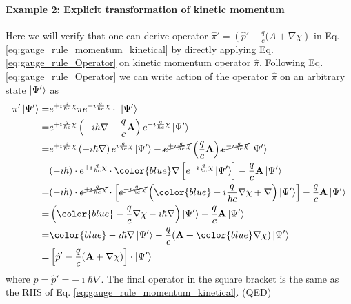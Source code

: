 \documentclass[11pt]{article}
\begin{document}
\paragraph{Example 2: Explicit transformation of kinetic momentum  }

Here we will verify that one can  derive  operator  $\hat \pi'=\left(\hat p' -\frac{q}{c}(A+ \nabla \chi\right)$ in Eq. \ref{eq:gauge_rule_momentum_kinetical} by directly  applying Eq.  \ref{eq:gauge_rule_Operator} on  kinetic momentum operator $\hat \pi$.
Following  Eq.\ref{eq:gauge_rule_Operator} we can  write action of the operator $\hat \pi$ on an arbitrary state $\ket{\Psi'}$ as 
\begin{align*}
\pi' \ket{\Psi'} =& e^{+\imath \frac{q}{\hbar c} \chi} \pi  e^{-\imath \frac{q}{\hbar c} \chi} \cdot\ \ket{ \Psi'}\\
=& e^{+\imath \frac{q}{\hbar c} \chi} \left( -\imath  \hbar \nabla -\frac{q}{c} 
    \vb A \right)  e^{-\imath \frac{q}{\hbar c} \chi}\ket{ \Psi'}\\
=&e^{+\imath \frac{q}{\hbar c} \chi} \left( -\imath  \hbar \nabla \right)  
    e^{\imath \frac{q}{\hbar c} \chi}\ket{ \Psi'}
    - \cancel{e^{+\imath \frac{q}{\hbar c} \chi}} \left(\frac{q}{c} \vb A \right) \cancel{  e^{-\imath \frac{q}{\hbar c} \chi} }\ket{ \Psi'}\\
=& (-\imath \hbar) \cdot e^{+\imath \frac{q}{\hbar c} \chi}\cdot 
    {\color{blue} \nabla} \left[ e^{-\imath \frac{q}{\hbar c} \chi}\ket{ \Psi'} \right] 
    -\frac{q}{c}\vb A \ket{\Psi'} \\
=&  (-\imath \hbar) \cdot \cancel { e^{+\imath \frac{q}{\hbar c} \chi}}\cdot 
    \left[  \cancel{ e^{-\imath \frac{q}{\hbar c} \chi} } \left({\color{blue} -\imath \frac{q}{\hbar c} \nabla \chi + \nabla } \right) \ket{\Psi'} \right]   -\frac{q}{c}\vb A \ket{\Psi'} \\
=& \left({ \color{blue} -\frac{q}{c} \nabla \chi -\imath \hbar \nabla  } \right)
    \ket{\Psi'} -\frac{q}{c}\vb A \ket{\Psi'} \\
=&  {\color{blue}   -\imath \hbar \nabla } \ket{\Psi'}   -\frac{q}{c} (\vb  A + {\color{blue} \nabla \chi }) \ket{\Psi'} \\
=&  \left[ \hat p' - \frac{q}{c} (\vb A +\nabla \chi ) \right] \cdot \ket{\Psi'}
\end{align*}
where  $\hat p=\hat p'=-\imath \hbar \nabla$. 
The final operator in the square bracket is the same  as the RHS of Eq. \ref{eq:gauge_rule_momentum_kinetical}. (QED)
\end{document}
